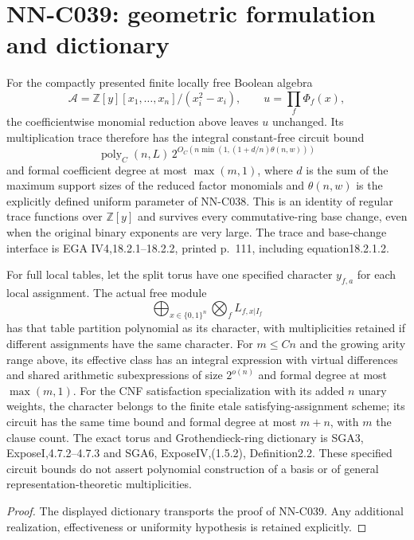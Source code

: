 \section{NN-C039: geometric formulation and dictionary}
\begin{geometricstatement}[NN-C039]
For the compactly presented finite locally free Boolean
algebra
\[
 \mathscr A=\mathbb Z[y][x_1,\ldots,x_n]/(x_i^2-x_i),
                \qquad u=\prod_f\Phi_f(x),
\]
the coefficientwise monomial reduction above leaves $u$
unchanged. Its multiplication trace therefore has the
integral constant-free circuit bound
\[
        \operatorname{poly}_C(n,L)\,
           2^{O_C(n\min(1,(1+d/n)\theta(n,w)))}
\]
and formal coefficient degree at most $\max(m,1)$, where
$d$ is the sum of the maximum support sizes of the reduced
factor monomials and $\theta(n,w)$ is the explicitly
defined uniform parameter of NN-C038. This is an identity
of regular trace functions over $\mathbb Z[y]$ and survives
every commutative-ring base change, even when the original
binary exponents are very large. The trace and base-change
interface is EGA IV4,18.2.1--18.2.2, printed p.~111,
including equation18.2.1.2.

For full local tables, let the split torus have one
specified character $y_{f,a}$ for each local assignment.
The actual free module
\[
             \bigoplus_{x\in\{0,1\}^n}
                          \bigotimes_f L_{f,x|I_f}
\]
has that table partition polynomial as its character,
with multiplicities retained if different assignments
have the same character. For $m\le Cn$ and the growing
arity range above, its effective class has an integral
expression with virtual differences and shared arithmetic
subexpressions of size $2^{o(n)}$ and formal degree at
most $\max(m,1)$. For the CNF satisfaction specialization
with its added $n$ unary weights, the character belongs to
the finite etale satisfying-assignment scheme; its circuit
has the same time bound and formal degree at most $m+n$,
with $m$ the clause count. The exact torus and Grothendieck-ring dictionary
is SGA3, ExposeI,4.7.2--4.7.3 and SGA6, ExposeIV,(1.5.2),
Definition2.2. These specified circuit bounds do not assert
polynomial construction of a basis or of general
representation-theoretic multiplicities.

\end{geometricstatement}
\begin{proof} The displayed dictionary transports the proof of NN-C039. Any additional realization, effectiveness or uniformity hypothesis is retained explicitly.\end{proof}


